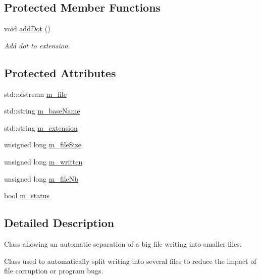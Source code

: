\subsection*{\-Protected \-Member \-Functions}
\begin{DoxyCompactItemize}
\item 
void \hyperlink{classdwf__utils_1_1file_splitter_a4fd2d84c91ac951a6286eb8d8a09ea7f}{add\-Dot} ()
\begin{DoxyCompactList}\small\item\em \-Add dot to extension. \end{DoxyCompactList}\end{DoxyCompactItemize}
\subsection*{\-Protected \-Attributes}
\begin{DoxyCompactItemize}
\item 
std\-::ofstream \hyperlink{classdwf__utils_1_1file_splitter_a52f6c1e3f991d724a0388479b1311eba}{m\-\_\-file}
\item 
std\-::string \hyperlink{classdwf__utils_1_1file_splitter_a975b8db38b39f88d3169465681004b3f}{m\-\_\-base\-Name}
\item 
std\-::string \hyperlink{classdwf__utils_1_1file_splitter_a41488fca3cd05509e44b83158bc928c2}{m\-\_\-extension}
\item 
unsigned long \hyperlink{classdwf__utils_1_1file_splitter_a61e584140f04b3a16f7c15a3df9e4cae}{m\-\_\-file\-Size}
\item 
unsigned long \hyperlink{classdwf__utils_1_1file_splitter_a298fb3ee2f1a79399402cd325de1d2b7}{m\-\_\-written}
\item 
unsigned long \hyperlink{classdwf__utils_1_1file_splitter_a8b18118f349455a6b7eeacb32005a871}{m\-\_\-file\-Nb}
\item 
bool \hyperlink{classdwf__utils_1_1file_splitter_a0222a87f2cd6079820e08313503e199e}{m\-\_\-status}
\end{DoxyCompactItemize}


\subsection{\-Detailed \-Description}
\-Class allowing an automatic separation of a big file writing into smaller files. 

\-Class used to automatically split writing into several files to reduce the impact of file corruption or program bugs. 

